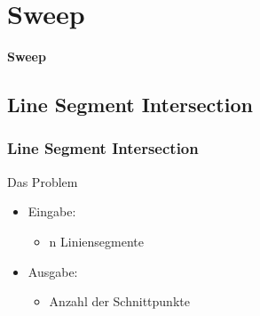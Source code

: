 \section{Sweep}
\begin{frame}
	\begin{center}
		\textbf{\LARGE{Sweep}}
	\end{center}
\end{frame}

\subsection{Line Segment Intersection}
\begin{frame}
	\frametitle{{Line Segment Intersection}}
	\begin{block}{Das Problem}
	\begin{itemize}
		\pause
		\item{Eingabe:}
		\begin{itemize}
			\item{n Liniensegmente}
		\end{itemize}
		\pause
		\item{Ausgabe:}
		\begin{itemize}
			\item{Anzahl der Schnittpunkte}
		\end{itemize}
	\end{itemize}
	\end{block}
\end{frame}
